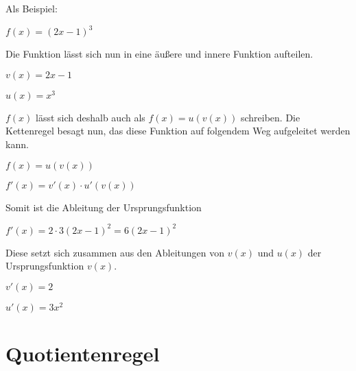 \documentclass[10pt,a4paper]{article}
\begin{document}
Als Beispiel:

$f(x) = (2x - 1)^3$

Die Funktion lässt sich nun in eine äußere und innere Funktion aufteilen.

$v(x) = 2x - 1$

$u(x) = x^3$

$f(x)$ lässt sich deshalb auch als $f(x) = u(v(x))$ schreiben.
Die Kettenregel besagt nun, das diese Funktion auf folgendem Weg aufgeleitet werden kann.

$f(x) = u(v(x))$

$f'(x) = v'(x) \cdot u'(v(x))$

Somit ist die Ableitung der Ursprungsfunktion

$f'(x) = 2 \cdot 3(2x - 1)^2 = 6(2x - 1)^2$

Diese setzt sich zusammen aus den Ableitungen von $v(x)$ und $u(x)$ der Ursprungsfunktion $v(x)$. 

$v'(x) = 2$

$u'(x) = 3x^2$

\section*{Quotientenregel}
\end{document}
